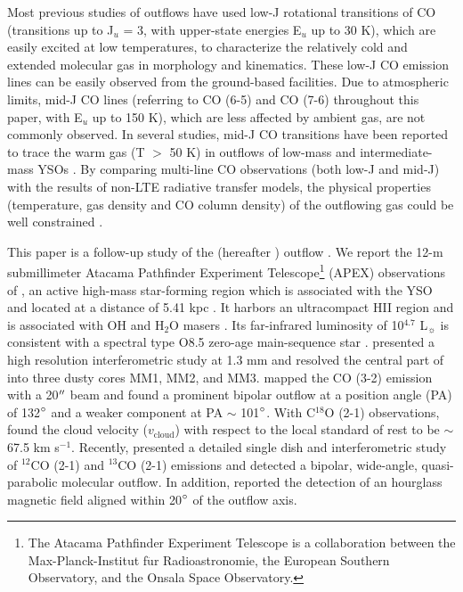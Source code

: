 Most previous studies of outflows have used low-J rotational transitions of CO (transitions up to J$_u$ = 3, with upper-state energies E$_u$ up to 30 K), which are easily excited at low temperatures, to characterize the relatively cold and extended molecular gas in morphology and kinematics. These low-J CO emission lines can be easily observed from the ground-based facilities. Due to atmospheric limits, mid-J CO lines (referring to CO (6-5) and CO (7-6) throughout this paper, with  E$_u$ up to 150 K), which are less affected by ambient gas, are not commonly observed. In several studies, mid-J CO transitions have been reported to trace the warm gas (T $>$ 50 K) in outflows of low-mass and intermediate-mass YSOs \citep{2009A&A...501..633V, 2009A&A...507.1425V, 2012A&A...542A..86Y, 2016A&A...587A..17V}.  By comparing multi-line CO observations (both low-J and mid-J) with the results of non-LTE radiative transfer models, the physical properties (temperature, gas density and CO column density) of the outflowing gas could be well constrained \citep{2015A&A...581A...4L}. 

This paper is a follow-up study of the  (hereafter ) outflow \citep{2009ApJ...696...66Q}. We report the 12-m submillimeter Atacama Pathfinder Experiment Telescope\footnote{    The Atacama Pathfinder Experiment Telescope is a collaboration between the Max-Planck-Institut f$\ddot{\mathrm{u}}$r Radioastronomie, the European Southern Observatory, and the Onsala Space Observatory.} (APEX) observations of , an active high-mass star-forming region which is associated with the YSO  and located at a distance of 5.41 kpc \citep{2015PASJ...67...69S}. It harbors an ultracompact HII region and is associated with OH and H$_2$O masers \citep{1993AJ....105.1495H, 1997MNRAS.289..203C, 1998AJ....116.1897M, 1999ApJS..123..487M, 2003MNRAS.341..551C}. Its far-infrared luminosity of 10$^{4.7}$ L$_\sun$ is consistent with a spectral type O8.5 zero-age main-sequence star \citep{1998AJ....116.1897M}. \citet{2009ApJ...696...66Q} presented a high resolution interferometric study at 1.3 mm and resolved the central part of  into three dusty cores MM1, MM2, and MM3. \citet{2003A&A...412..175K} mapped the CO (3-2) emission with a 20${\mbox{$^{\prime\prime}$}}$ beam and found a prominent bipolar outflow at a position angle (PA) of 132${\mbox{$^\circ$}}$ and a weaker component at PA $\sim$ 101${\mbox{$^\circ$}}$. With C$^{18}$O (2-1) observations, \citet{2003A&A...412..175K} found the cloud velocity ($v_{\mathrm{cloud}}$) with respect to the local standard of rest to be $\sim$ 67.5 km s$^{-1}$. Recently, \citet{2009ApJ...696...66Q} presented a detailed single dish and interferometric study of $^{12}$CO (2-1) and $^{13}$CO (2-1) emissions and detected a bipolar, wide-angle, quasi-parabolic molecular outflow. In addition, \citet{2014ApJ...794L..18Q} reported the detection of an hourglass magnetic field aligned within 20${\mbox{$^\circ$}}$ of the outflow axis.

